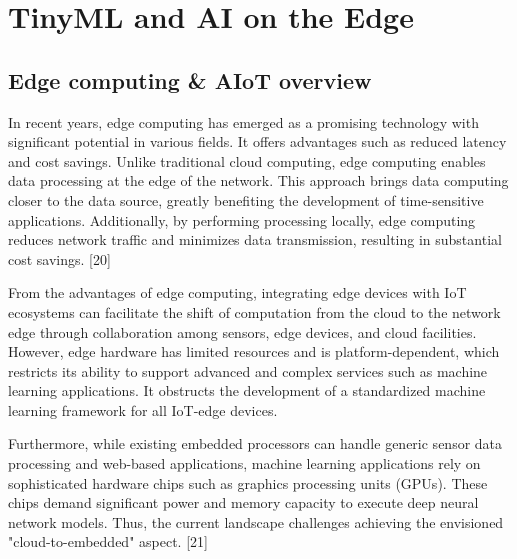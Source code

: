 \section{TinyML and AI on the Edge}
\subsection{Edge computing & AIoT overview}
\indent In recent years, edge computing has emerged as a promising technology with significant potential in various fields. It offers advantages such as reduced latency and cost savings. Unlike traditional cloud computing, edge computing enables data processing at the edge of the network. 
This approach brings data computing closer to the data source, greatly benefiting the development of time-sensitive applications. Additionally, by performing processing locally, edge computing reduces network traffic and minimizes data transmission, resulting in substantial cost savings. [20]

From the advantages of edge computing, integrating edge devices with IoT ecosystems can facilitate the shift of computation from the cloud to the network edge through collaboration among sensors, edge devices, and cloud facilities.
However, edge hardware has limited resources and is platform-dependent, which restricts its ability to support advanced and complex services such as machine learning applications. It obstructs the development of a standardized machine learning framework for all IoT-edge devices.

Furthermore, while existing embedded processors can handle generic sensor data processing and web-based applications, machine learning applications rely on sophisticated hardware chips such as graphics processing units (GPUs). 
These chips demand significant power and memory capacity to execute deep neural network models. Thus, the current landscape challenges achieving the envisioned "cloud-to-embedded" aspect. [21]

